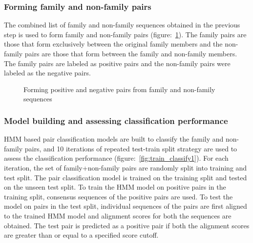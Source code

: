 \documentclass{article}
\begin{document}
			\subsubsection{Forming family and non-family pairs}
			The combined list of family and non-family sequences obtained in the previous step is used to form family and non-family pairs (figure:~\ref{fig:forming_pairs}). The family pairs are those that form exclusively between the original family members and the non-family pairs are those that form between the family and non-family members. The family pairs are labeled as positive pairs and the non-family pairs were labeled as the negative pairs.
			
			\begin{figure}
				\caption{Forming positive and negative pairs from family and non-family sequences}
				\label{fig:forming_pairs}
			\end{figure}
			
			\subsubsection{Model building and assessing classification performance}
			HMM based pair classification models are built to classify the family and non-family pairs, and 10 iterations of repeated test-train split strategy are used to assess the classification performance (figure:~\ref{fig:train_classify1}). For each iteration, the set of family+non-family pairs are randomly split into training and test split. The pair classification model is trained on the training split and tested on the unseen test split. To train the HMM model on positive pairs in the training split, consensus sequences of the positive pairs are used. To test the model on pairs in the test split, individual sequences of the pairs are first aligned to the trained HMM model and alignment scores for both the sequences are obtained. The test pair is predicted as a positive pair if both the alignment scores are greater than or equal to a specified score cutoff.
			
\end{document}
